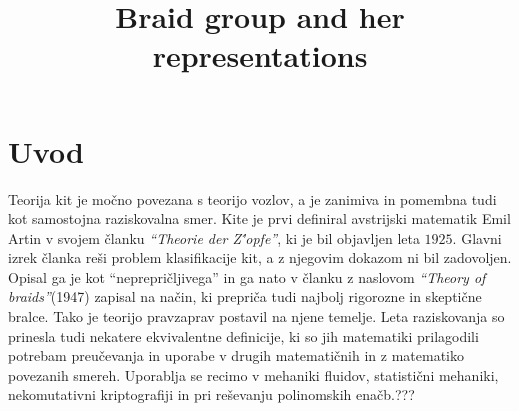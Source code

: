 \documentclass[mat1]{fmfdelo}
\title{Braid group and her representations}
\begin{document}
\section{Uvod}

Teorija kit je močno povezana s teorijo vozlov, a je zanimiva in pomembna tudi kot samostojna raziskovalna smer. Kite je prvi definiral avstrijski matematik Emil Artin v svojem članku \emph{``Theorie der Z\''{o}pfe''}, ki je bil objavljen leta $1925$. Glavni izrek članka reši problem klasifikacije kit, a z njegovim dokazom ni bil zadovoljen. Opisal ga je kot ``neprepričljivega'' in ga nato v članku z naslovom \emph{``Theory of braids''}(1947) zapisal na način, ki prepriča tudi najbolj rigorozne in skeptične bralce. Tako je teorijo pravzaprav postavil na njene temelje. Leta raziskovanja so prinesla tudi nekatere ekvivalentne definicije, ki so jih matematiki prilagodili potrebam preučevanja in uporabe v drugih matematičnih in z matematiko povezanih smereh. Uporablja se recimo v mehaniki fluidov, statistični mehaniki, nekomutativni kriptografiji in pri reševanju polinomskih enačb.???

%
%
%
%
%
%
%
%
\end{document}
